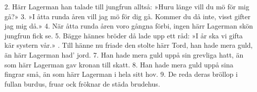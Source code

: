 \setlength{\columnsep}{0.1cm}
\begin{multicols}{2}
2.  Härr Lagerman han talade till jungfrun alltså:
    »Huru länge vill du mö för mig gå?»
3.  »I åtta runda åren vill jag mö för dig gå.
    Kommer du då inte, visst gifter jag mig då.»
4.  När åtta runda åren voro gångna förbi,
    ingen härr Lagerman skön jungfrun fick se.
5.  Bägge hännes bröder då lade upp ett råd:
    »I år ska vi gifta kär systern vår.»
\vfill{}.  Till hänne nu friade den stolte härr Tord,
    han hade mera guld, än härr Lagerman had’ jord.
7.  Han hade mera guld uppå sin grevliga hatt,
    än som härr Lagerman gav kronan till skatt.
8.  Han hade mera guld uppå sina fingrar små,
    än som härr Lagerman i hela sitt hov.
9.  De reda deras bröllop i fullan burdus,
    fruar ock fröknar de städa brudehus.
\end{multicols}
\newpage
